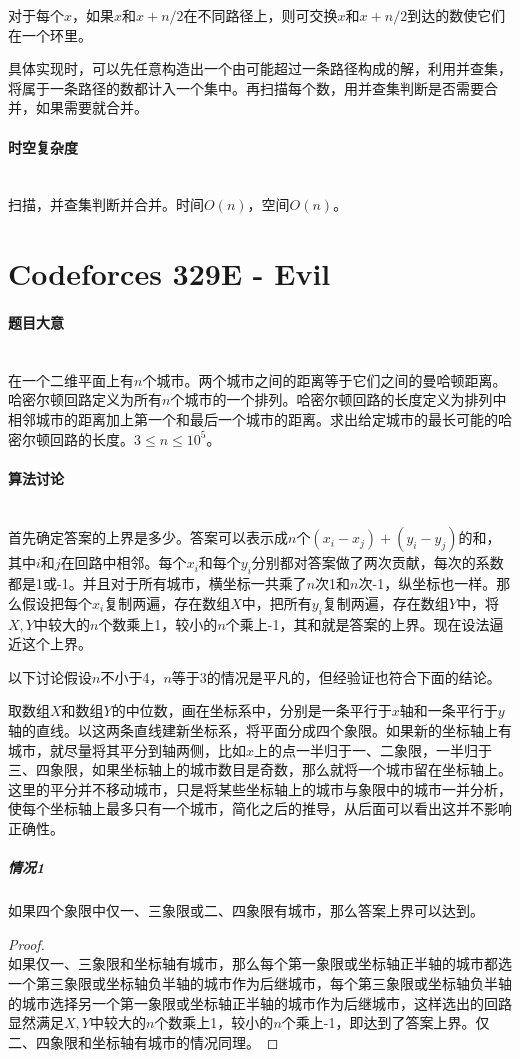 \documentclass[UTF8]{ctexart}
\newcommand{\myparagraph}[1]{\paragraph{#1}\mbox{}\\}
\theoremstyle{nonumberplain}
\newtheorem{proof}{\hspace{1em}证明：}
\begin{document}
			对于每个$x$，如果$x$和$x+n/2$在不同路径上，则可交换$x$和$x+n/2$到达的数使它们在一个环里。
			
			具体实现时，可以先任意构造出一个由可能超过一条路径构成的解，利用并查集，将属于一条路径的数都计入一个集中。再扫描每个数，用并查集判断是否需要合并，如果需要就合并。
		
		\myparagraph{时空复杂度}
		
			扫描，并查集判断并合并。时间$O(n)$，空间$O(n)$。
	
	\section{Codeforces 329E - Evil}
	
		\myparagraph{题目大意}
		
			在一个二维平面上有$n$个城市。两个城市之间的距离等于它们之间的曼哈顿距离。哈密尔顿回路定义为所有$n$个城市的一个排列。哈密尔顿回路的长度定义为排列中相邻城市的距离加上第一个和最后一个城市的距离。求出给定城市的最长可能的哈密尔顿回路的长度。$3 \leq n \leq 10^5$。
			
		\myparagraph{算法讨论}
		
			首先确定答案的上界是多少。答案可以表示成$n$个$(x_i-x_j)+(y_i-y_j)$的和，其中$i$和$j$在回路中相邻。每个$x_i$和每个$y_i$分别都对答案做了两次贡献，每次的系数都是1或-1。并且对于所有城市，横坐标一共乘了$n$次1和$n$次-1，纵坐标也一样。那么假设把每个$x_i$复制两遍，存在数组$X$中，把所有$y_i$复制两遍，存在数组$Y$中，将$X,Y$中较大的$n$个数乘上1，较小的$n$个乘上-1，其和就是答案的上界。现在设法逼近这个上界。
			
			以下讨论假设$n$不小于4，$n$等于3的情况是平凡的，但经验证也符合下面的结论。
			
			取数组$X$和数组$Y$的中位数，画在坐标系中，分别是一条平行于$x$轴和一条平行于$y$轴的直线。以这两条直线建新坐标系，将平面分成四个象限。如果新的坐标轴上有城市，就尽量将其平分到轴两侧，比如$x$上的点一半归于一、二象限，一半归于三、四象限，如果坐标轴上的城市数目是奇数，那么就将一个城市留在坐标轴上。这里的平分并不移动城市，只是将某些坐标轴上的城市与象限中的城市一并分析，使每个坐标轴上最多只有一个城市，简化之后的推导，从后面可以看出这并不影响正确性。
			
			\subparagraph{情况1}
			如果四个象限中仅一、三象限或二、四象限有城市，那么答案上界可以达到。
			
			\begin{proof}\mbox{}\\
			
				如果仅一、三象限和坐标轴有城市，那么每个第一象限或坐标轴正半轴的城市都选一个第三象限或坐标轴负半轴的城市作为后继城市，每个第三象限或坐标轴负半轴的城市选择另一个第一象限或坐标轴正半轴的城市作为后继城市，这样选出的回路显然满足$X,Y$中较大的$n$个数乘上1，较小的$n$个乘上-1，即达到了答案上界。仅二、四象限和坐标轴有城市的情况同理。
			\end{proof}
			
\end{document}
